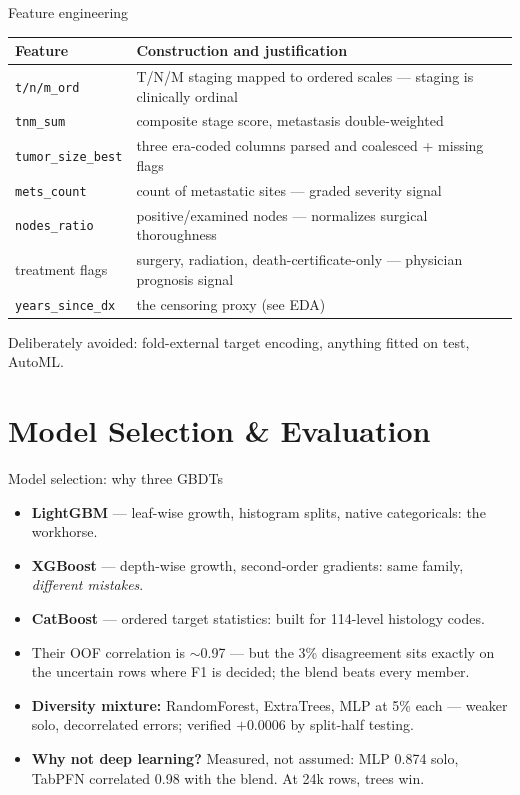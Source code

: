 \documentclass[aspectratio=169,10pt]{beamer}
\begin{document}
\begin{frame}{Feature engineering}
  \scriptsize
  \begin{tabular}{@{}p{3.4cm}p{9.2cm}@{}}
    \toprule
    \textbf{Feature} & \textbf{Construction and justification}\\
    \midrule
    \texttt{t/n/m\_ord} & T/N/M staging mapped to ordered scales --- staging is clinically ordinal\\
    \texttt{tnm\_sum} & composite stage score, metastasis double-weighted\\
    \texttt{tumor\_size\_best} & three era-coded columns parsed and coalesced + missing flags\\
    \texttt{mets\_count} & count of metastatic sites --- graded severity signal\\
    \texttt{nodes\_ratio} & positive/examined nodes --- normalizes surgical thoroughness\\
    treatment flags & surgery, radiation, death-certificate-only --- physician prognosis signal\\
    \texttt{years\_since\_dx} & the censoring proxy (see EDA)\\
    \bottomrule
  \end{tabular}
  \vspace{5pt}\par\tiny\color{mutedgray}
  Deliberately avoided: fold-external target encoding, anything fitted on test, AutoML.
\end{frame}

\section{Model Selection \& Evaluation}

\begin{frame}{Model selection: why three GBDTs}
  \begin{itemize}
    \item \textbf{LightGBM} --- leaf-wise growth, histogram splits, native categoricals: the workhorse.
    \item \textbf{XGBoost} --- depth-wise growth, second-order gradients: same family,
          \emph{different mistakes}.
    \item \textbf{CatBoost} --- ordered target statistics: built for 114-level histology codes.
    \item Their OOF correlation is $\sim$0.97 --- but the 3\% disagreement sits exactly on the
          uncertain rows where F1 is decided; the blend beats every member.
    \item \textbf{Diversity mixture:} RandomForest, ExtraTrees, MLP at 5\% each ---
          weaker solo, decorrelated errors; verified $+0.0006$ by split-half testing.
    \item \textbf{Why not deep learning?} Measured, not assumed: MLP 0.874 solo,
          TabPFN correlated 0.98 with the blend. At 24k rows, trees win.
  \end{itemize}
\end{frame}
\end{document}
